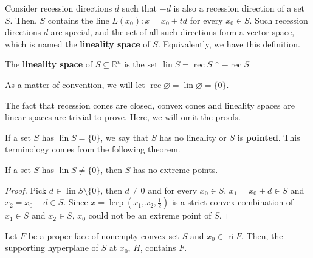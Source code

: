 Consider recession directions \( d \) such that \( -d \) is also a recession
direction of a set \( S \). Then, \( S \) contains the line \( L(x_{0}): x =
x_{0} + t d \) for every \( x_{0} \in S \). Such recession directions \( d \)
are special, and the set of all such directions form a vector space, which is
named the \textbf{lineality space} of \( S \). Equivalently, we have this
definition.

\begin{definition}
\label{def:Lineality space}
  The \textbf{lineality space} of \( S \subseteq \mathbb{R}^{n} \) is the set \(
  \operatorname{lin} S = \operatorname{rec} S \cap -\operatorname{rec} S \)
\end{definition}

As a matter of convention, we will let \( \operatorname{rec} \varnothing =
\operatorname{lin} \varnothing = \{0\}   \).

The fact that recession cones are closed, convex cones and
lineality spaces are linear
spaces are trivial to prove. Here, we will omit the proofs.

If a set \( S \) has \( \operatorname{lin} S = \{0\}   \), we say that \( S
\) has no lineality or \( S \) is \textbf{pointed}. This
terminology comes from the following theorem.

\begin{theorem}
\label{thr:Non-zero lineality implies no extreme points}
  If a set \( S \) has \( \operatorname{lin} S \neq  \{0\}   \), then \( S \)
  has no extreme points.
\end{theorem}

\begin{proof}
  Pick \( d \in \operatorname{lin} S \setminus \{0\}   \), then \( d \neq 0 \)
  and for every \( x_{0} \in S \), \( x_{1} = x_{0} + d \in S \) and \( x_{2} =
  x_{0} - d \in S\). Since \( x = \operatorname{lerp}\left(x_{1}, x_{2},
  \frac{1}{2}\right)
  \) is a strict convex combination of \( x_{1} \in S \) and \( x_{2} \in S \),
  \( x_{0} \) could not be an extreme point of \( S \).
\end{proof}

\begin{theorem}
\label{thr:Supporting hyperplane at interior point of faces}
  Let \( F \) be a proper face of nonempty convex set \( S \) and \( x_{0} \in
  \operatorname{ri} F \). Then, the supporting hyperplane of \( S \) at \( x_{0}
  \), \( H \), contains \( F \).
\end{theorem}

